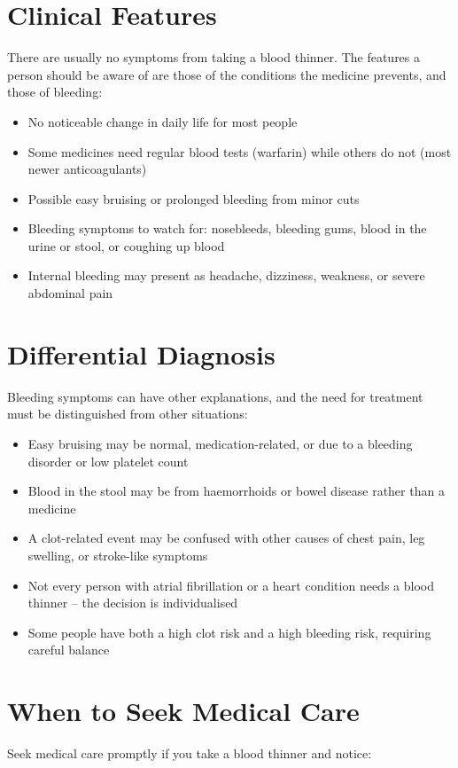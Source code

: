 \section*{Clinical Features}
There are usually no symptoms from taking a blood thinner. The features a person should be aware of are those of the conditions the medicine prevents, and those of bleeding:

\begin{itemize}
    \item No noticeable change in daily life for most people
    \item Some medicines need regular blood tests (warfarin) while others do not (most newer anticoagulants)
    \item Possible easy bruising or prolonged bleeding from minor cuts
    \item Bleeding symptoms to watch for: nosebleeds, bleeding gums, blood in the urine or stool, or coughing up blood
    \item Internal bleeding may present as headache, dizziness, weakness, or severe abdominal pain
\end{itemize}

\section*{Differential Diagnosis}
Bleeding symptoms can have other explanations, and the need for treatment must be distinguished from other situations:

\begin{itemize}
    \item Easy bruising may be normal, medication-related, or due to a bleeding disorder or low platelet count
    \item Blood in the stool may be from haemorrhoids or bowel disease rather than a medicine
    \item A clot-related event may be confused with other causes of chest pain, leg swelling, or stroke-like symptoms
    \item Not every person with atrial fibrillation or a heart condition needs a blood thinner -- the decision is individualised
    \item Some people have both a high clot risk and a high bleeding risk, requiring careful balance
\end{itemize}

\section*{When to Seek Medical Care}
Seek medical care promptly if you take a blood thinner and notice:


